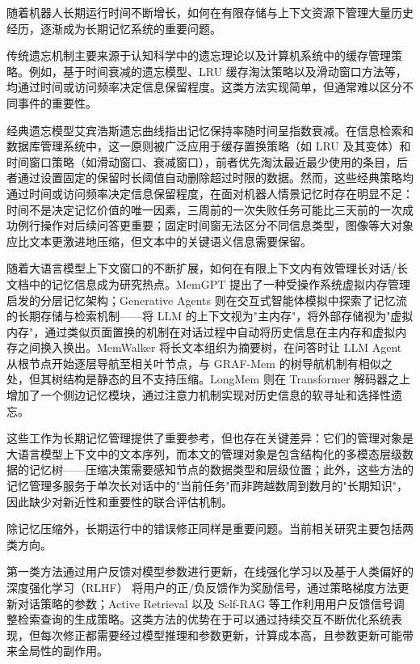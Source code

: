 随着机器人长期运行时间不断增长，如何在有限存储与上下文资源下管理大量历史经历，逐渐成为长期记忆系统的重要问题。

传统遗忘机制主要来源于认知科学中的遗忘理论以及计算机系统中的缓存管理策略。例如，基于时间衰减的遗忘模型、LRU 缓存淘汰策略以及滑动窗口方法等，均通过时间或访问频率决定信息保留程度。这类方法实现简单，但通常难以区分不同事件的重要性。

经典遗忘模型艾宾浩斯遗忘曲线\cite{ebbinghaus1913memory}指出记忆保持率随时间呈指数衰减。在信息检索和数据库管理系统中，这一原则被广泛应用于缓存置换策略（如 LRU 及其变体）和时间窗口策略（如滑动窗口、衰减窗口），前者优先淘汰最近最少使用的条目，后者通过设置固定的保留时长阈值自动删除超过时限的数据。然而，这些经典策略均通过时间或访问频率决定信息保留程度，在面对机器人情景记忆时存在明显不足：时间不是决定记忆价值的唯一因素，三周前的一次失败任务可能比三天前的一次成功例行操作对后续问答更重要；固定时间窗无法区分不同信息类型，图像等大对象应比文本更激进地压缩，但文本中的关键语义信息需要保留。

随着大语言模型上下文窗口的不断扩展，如何在有限上下文内有效管理长对话/长文档中的记忆信息成为研究热点。MemGPT\cite{packer2023memgpt} 提出了一种受操作系统虚拟内存管理启发的分层记忆架构；Generative Agents\cite{park2023generative} 则在交互式智能体模拟中探索了记忆流的长期存储与检索机制——将 LLM 的上下文视为"主内存"，将外部存储视为"虚拟内存"，通过类似页面置换的机制在对话过程中自动将历史信息在主内存和虚拟内存之间换入换出。MemWalker\cite{chen2023memwalker} 将长文本组织为摘要树，在问答时让 LLM Agent 从根节点开始逐层导航至相关叶节点，与 GRAF-Mem 的树导航机制有相似之处，但其树结构是静态的且不支持压缩。LongMem\cite{wang2023longmem} 则在 Transformer 解码器之上增加了一个侧边记忆模块，通过注意力机制实现对历史信息的软寻址和选择性遗忘。

这些工作为长期记忆管理提供了重要参考，但也存在关键差异：它们的管理对象是大语言模型上下文中的文本序列，而本文的管理对象是包含结构化的多模态层级数据的记忆树——压缩决策需要感知节点的数据类型和层级位置；此外，这些方法的记忆管理多服务于单次长对话中的"当前任务"而非跨越数周到数月的"长期知识"，因此缺少对新近性和重要性的联合评估机制。

除记忆压缩外，长期运行中的错误修正同样是重要问题。当前相关研究主要包括两类方向。

第一类方法通过用户反馈对模型参数进行更新，在线强化学习\cite{singh2000rl}以及基于人类偏好的深度强化学习（RLHF）\cite{christiano2017rlhf} 将用户的正/负反馈作为奖励信号，通过策略梯度方法更新对话策略的参数；Active Retrieval\cite{jiang2023activeretrieval} 以及 Self-RAG\cite{asai2024selfrag} 等工作利用用户反馈信号调整检索查询的生成策略。这类方法的优势在于可以通过持续交互不断优化系统表现，但每次修正都需要经过模型推理和参数更新，计算成本高，且参数更新可能带来全局性的副作用。

